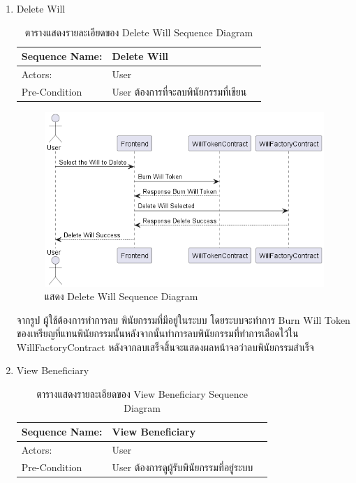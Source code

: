 \documentclass[12pt,oneside,openright,a4paper]{cpe-thai-project}
\begin{document}
\begin{enumerate}[label=\thesubsection.\arabic*,leftmargin=0pt,itemindent=1.25cm]
\clearpage
	\item Delete Will
	\begin{table}[h]
		\centering
		\caption{ตารางแสดงรายละเอียดของ Delete Will Sequence Diagram}
		\begin{tabularx}{\textwidth}{|l|X|X|} 
			\hline
			Sequence Name: & Delete Will                           \\ 
			\hline
			Actors:        & User                                  \\ 
			\hline
			Pre-Condition  & User ต้องการที่จะลบพินัยกรรมที่เขียน  \\
			\hline
		\end{tabularx}
	\end{table}
		\begin{figure}[!thb]
			\centering
			\includegraphics[scale=0.5]{deleteWillseq}
			\caption{แสดง Delete Will Sequence Diagram}
		\end{figure}
		\FloatBarrier
	\tab จากรูป ผู้ใช้ต้องการทำการลบ พินัยกรรมที่มีอยู่ในระบบ โดยระบบจะทำการ Burn Will Token ของเหรียญที่แทนพินัยกรรมนั้นหลังจากนั้นทำการลบพินัยกรรมที่ทำการเลือดไว้ใน WillFactoryContract หลังจากลบเสร็จสิ้นจะแสดงผลหน้าจอว่าลบพินัยกรรมสำเร็จ 
\clearpage
\item View Beneficiary
	\begin{table}[h]
	\centering
	\caption{ตารางแสดงรายละเอียดของ View Beneficiary Sequence Diagram}
	\begin{tabularx}{\textwidth}{|l|X|X|} 
		\hline
		Sequence Name: & View Beneficiary                                    \\ 
		\hline
		Actors:        & User                                                  \\ 
		\hline
		Pre-Condition  & User ต้องการดูผู้รับพินัยกรรมที่อยู่ระบบ \\

\end{tabularx}
\end{table}
\end{enumerate}
\end{document}
